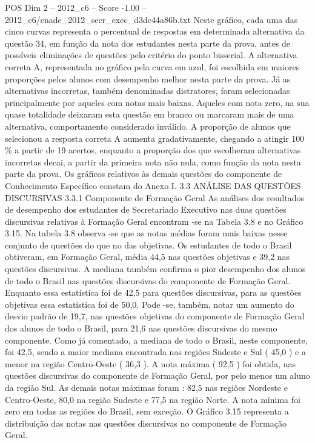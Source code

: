 \begin{textsample}{POS Dim 2 – 2012\_c6 – Score -1.00 – 2012\_c6/enade\_2012\_secr\_exec\_d3dc44a86b.txt}
Neste gráfico, cada uma das cinco curvas representa o percentual de respostas em determinada alternativa da questão 34, em função da nota dos estudantes nesta parte da prova, antes de possíveis eliminações de questões pelo critério do ponto bisserial.
A alternativa correta A, representada no gráfico pela curva em azul, foi escolhida em maiores proporções pelos alunos com desempenho melhor nesta parte da prova.
Já as alternativas incorretas, também denominadas distratores, foram selecionadas principalmente por aqueles com notas mais baixas.
Aqueles com nota zero, na sua quase totalidade deixaram esta questão em branco ou marcaram mais de uma alternativa, comportamento considerado inválido.
A proporção de alunos que selecionou a resposta correta A aumenta gradativamente, chegando a atingir 100 \% a partir de 19 acertos, enquanto a proporção dos que escolheram alternativas incorretas decai, a partir da primeira nota não nula, como função da nota nesta parte da prova.
Os gráficos relativos às demais questões do componente de Conhecimento Específico constam do Anexo I. 3.3 ANÁLISE DAS QUESTÕES DISCURSIVAS 3.3.1 Componente de Formação Geral As análises dos resultados de desempenho dos estudantes de Secretariado Executivo nas duas questões discursivas relativas à Formação Geral encontram -se na Tabela 3.8 e no Gráfico 3.15.
Na tabela 3.8 observa -se que as notas médias foram mais baixas nesse conjunto de questões do que no das objetivas.
Os estudantes de todo o Brasil obtiveram, em Formação Geral, média 44,5 nas questões objetivas e 39,2 nas questões discursivas.
A mediana também confirma o pior desempenho dos alunos de todo o Brasil nas questões discursivas do componente de Formação Geral.
Enquanto essa estatística foi de 42,5 para questões discursivas, para as questões objetivas essa estatística foi de 50,0.
Pode -se, também, notar um aumento do desvio padrão de 19,7, nas questões objetivas do componente de Formação Geral dos alunos de todo o Brasil, para 21,6 nas questões discursivas do mesmo componente.
Como já comentado, a mediana de todo o Brasil, neste componente, foi 42,5, sendo a maior mediana encontrada nas regiões Sudeste e Sul ( 45,0 ) e a menor na região Centro-Oeste ( 36,3 ).
A nota máxima ( 92,5 ) foi obtida, nas questões discursivas do componente de Formação Geral, por pelo menos um aluno da região Sul.
As demais notas máximas foram : 82,5 nas regiões Nordeste e Centro-Oeste, 80,0 na região Sudeste e 77,5 na região Norte.
A nota mínima foi zero em todas as regiões do Brasil, sem exceção.
O Gráfico 3.15 representa a distribuição das notas nas questões discursivas no componente de Formação Geral.

\end{textsample}
